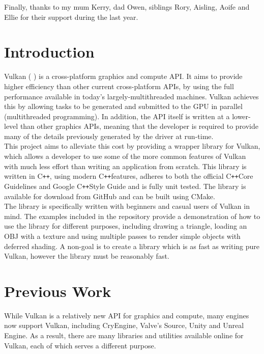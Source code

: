 \documentclass[12pt]{report}
\newcommand{\citesoftware}[1]{(\citeauthor{#1} \citeyear{#1})}
\newcommand{\cpp}{C\texttt{++}}
\theoremstyle{definition}
\begin{document}
    Finally, thanks to my mum Kerry, dad Owen, siblings Rory, Aisling, Aoife and Ellie for
    their support during the last year. \\

  \tableofcontents

  \listoffigures

  \chapter{Introduction}
    Vulkan \citesoftware{vulkan} is a cross-platform graphics and compute API.
    It aims to provide higher efficiency than other current
    cross-platform APIs, by using the full performance available in today's
    largely-multithreaded machines. Vulkan achieves this by allowing tasks to be
    generated and submitted to the GPU in parallel (multithreaded programming).
    In addition, the API itself is written at a lower-level than other graphics
    APIs, meaning that the developer is required to provide many of the details
    previously generated by the driver at run-time.\\

    This project aims to alleviate this cost by providing a wrapper library for
    Vulkan, which allows a developer to use some of the more common features of
    Vulkan with much less effort than writing an application from scratch. This
    library is written in \cpp, using modern \cpp features, adheres to both the
    official \cpp Core Guidelines and Google \cpp Style Guide and is fully unit
    tested. The library is available for download from GitHub and can be built
    using CMake.\\

    The library is specifically written with beginners and casual users of
    Vulkan in mind. The examples included in the repository provide a
    demonstration of how to use the library for different purposes, including
    drawing a triangle, loading an OBJ with a texture and using multiple passes
    to render simple objects with deferred shading. A non-goal is to create a
    library which is as fast as writing pure Vulkan, however the library
    must be reasonably fast.\\

  \chapter{Previous Work}

    While Vulkan is a relatively new API for graphics and compute, many engines
    now support Vulkan, including CryEngine, Valve's Source, Unity and Unreal
    Engine. As a result, there are many libraries and utilities available
    online for Vulkan, each of which serves a different purpose.
\end{document}
